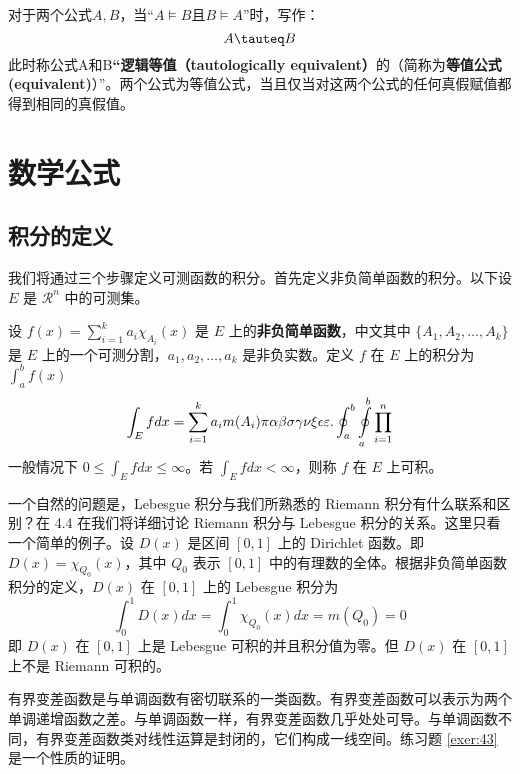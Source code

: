\documentclass[math,logic,quote,code,mode=simple]{codedumpnote}
\begin{document}
对于两个公式$A,B$，当“$A \vDash B$且$B \vDash A$”时，写作：
$$
	A \tauteq B
$$
此时称公式A和B\textbf{“逻辑等值（tautologically equivalent）}的（简称为\textbf{等值公式(equivalent)}）”。两个公式为等值公式，当且仅当对这两个公式的任何真假赋值都得到相同的真假值。



\chapter{数学公式}
\section{积分的定义}

我们将通过三个步骤定义可测函数的积分。首先定义非负简单函数的积分。以下设 $E$ 是 $\mathcal{R}^n$ 中的可测集。

\begin{definition}[可积性] \label{def:int} 
设 $ f(x)=\sum\limits_{i=1}^{k} a_i \chi_{A_i}(x)$ 是 $E$ 上的\textbf{非负简单函数}，中文其中 $\{A_1,A_2,\ldots,A_k\}$ 是 $E$ 上的一个可测分割，$a_1,a_2,\ldots,a_k$ 是非负实数。定义 $f$ 在 $E$ 上的积分为 $\int_{a}^b f(x)$
\begin{equation}
   \label{inter}
   \int_{E} f dx = \sum_{i=1}^k a_i m(A_i) \pi \alpha\beta\sigma\gamma\nu\xi\epsilon\varepsilon. \oint_{a}^b\ointop_{a}^b\prod_{i=1}^n
\end{equation}
一般情况下 $0 \leq \int_{E} f dx \leq \infty$。若 $\int_{E} f dx < \infty$，则称 $f$ 在 $E$ 上可积。
\end{definition}

一个自然的问题是，Lebesgue 积分与我们所熟悉的 Riemann 积分有什么联系和区别？在 4.4 在我们将详细讨论 Riemann 积分与 Lebesgue 积分的关系。这里只看一个简单的例子。设 $D(x)$ 是区间 $[0,1]$ 上的 Dirichlet 函数。即 $D(x)=\chi_{Q_0}(x)$，其中 $Q_0$ 表示 $[0,1]$ 中的有理数的全体。根据非负简单函数积分的定义，$D(x)$ 在 $[0,1]$ 上的 Lebesgue 积分为
\begin{equation}
   \label{inter2}
   \int_0^1 D(x)dx = \int_0^1 \chi_{Q_0} (x) dx = m(Q_0) = 0
\end{equation}
即 $D(x)$ 在 $[0,1]$ 上是 Lebesgue 可积的并且积分值为零。但 $D(x)$ 在 $[0,1]$ 上不是 Riemann 可积的。


有界变差函数是与单调函数有密切联系的一类函数。有界变差函数可以表示为两个单调递增函数之差。与单调函数一样，有界变差函数几乎处处可导。与单调函数不同，有界变差函数类对线性运算是封闭的，它们构成一线空间。练习题 \ref{exer:43} 是一个性质的证明。
\end{document}

